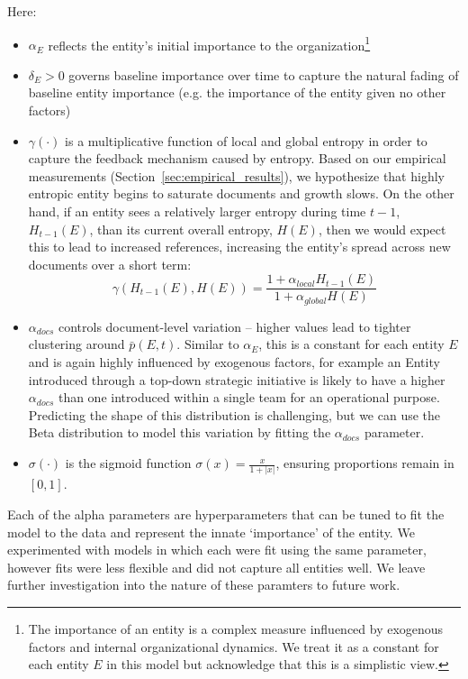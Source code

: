 \documentclass[11pt,a4paper]{article}
\begin{document}
Here:
\begin{itemize}
    \item $\alpha_E$ reflects the entity's initial importance to the organization\footnote{The importance of an entity is a complex measure influenced by exogenous factors and internal organizational dynamics. We treat it as a constant for each entity $E$ in this model but acknowledge that this is a simplistic view.}
    \item $\delta_E > 0$ governs baseline importance over time to capture the natural fading of baseline entity importance (e.g. the importance of the entity given no other factors)
    \item $\gamma(\cdot)$ is a multiplicative function of local and global entropy in order to capture the feedback mechanism caused by entropy. Based on our empirical measurements (Section~\ref{sec:empirical_results}), we hypothesize that highly entropic entity begins to saturate documents and growth slows. On the other hand, if an entity sees a relatively larger entropy during time $t-1$, $H_{t-1}(E)$, than its current overall entropy, $H(E)$, then we would expect this to lead to increased references, increasing the entity's spread across new documents over a short term:
    \begin{equation}
        \gamma(H_{t-1}(E), H(E)) = \frac{1 + \alpha_{local} H_{t-1}(E)}{1 + \alpha_{global}H(E)}
    \end{equation}
    \item $\alpha_{docs}$ controls document-level variation -- higher values lead to tighter clustering around $\bar{p}(E,t)$. Similar to $\alpha_E$, this is a constant for each entity $E$ and is again highly influenced by exogenous factors, for example an Entity introduced through a top-down strategic initiative is likely to have a higher $\alpha_{docs}$ than one introduced within a single team for an operational purpose. Predicting the shape of this distribution is challenging, but we can use the Beta distribution to model this variation by fitting the $\alpha_{docs}$ parameter.
    \item $\sigma(\cdot)$ is the sigmoid function $\sigma(x) = \frac{x}{1+ |x|}$, ensuring proportions remain in $[0,1]$.
\end{itemize}

Each of the alpha parameters are hyperparameters that can be tuned to fit the model to the data and represent the innate `importance' of the entity. We experimented with models in which each were fit using the same parameter, however fits were less flexible and did not capture all entities well. We leave further investigation into the nature of these paramters to future work.
\end{document}
